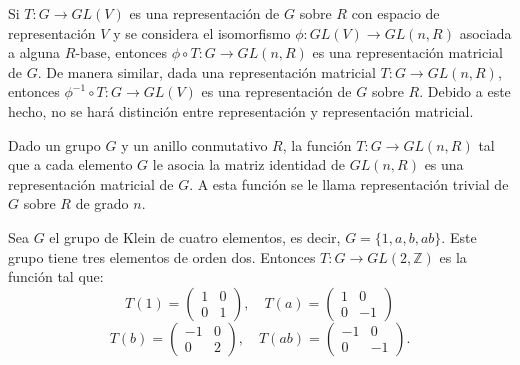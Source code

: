 Si $T \colon G \to GL(V)$ es una representación de $G$ sobre $R$ con espacio de representación $V$ y se considera el isomorfismo $\phi \colon GL(V) \to GL(n,R)$ asociada a alguna $R\mbox{-base}$, entonces $\phi \circ T \colon G \to GL(n, R)$ es una representación matricial de $G$. De manera similar, dada una representación matricial $T \colon G \to GL(n,R)$, entonces $\phi^{-1}\circ T \colon G \to GL(V)$ es una representación de $G$ sobre $R$. Debido a este hecho, no se hará distinción entre representación y representación matricial.
\begin{ejemplo}
Dado un grupo $G$ y un anillo conmutativo $R$, la función $T \colon G \to GL(n,R)$ tal que a cada elemento $G$ le asocia la matriz identidad de $GL(n,R)$ es una representación matricial de $G$. A esta función  se le llama representación trivial de $G$ sobre $R$ de grado $n$. 
\end{ejemplo}
\begin{ejemplo}
Sea $G$ el grupo de Klein de cuatro elementos, es  decir, $G = \{ 1, a, b, ab\}$. Este grupo tiene tres elementos de orden dos. Entonces $T \colon G \to GL(2, \mathds{Z})$ es la función tal que:
\begin{equation*} T(1) = \begin{pmatrix}
1 & 0 \\
0 & 1
\end{pmatrix}, \quad T(a) = \begin{pmatrix}
1 & 0 \\
0 & -1
\end{pmatrix} \end{equation*}
\begin{equation*} T(b) = \begin{pmatrix}
-1 & 0 \\
0 & 2
\end{pmatrix}, \quad T(ab) = \begin{pmatrix}
-1 & 0 \\
0 & -1
\end{pmatrix}. \end{equation*}
\end{ejemplo}
